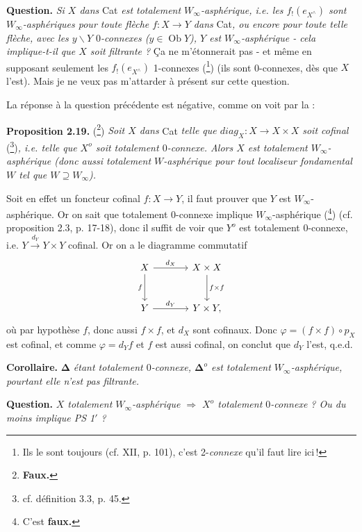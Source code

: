 \documentclass[11pt]{article}
\newcommand{\printedpage}[1]{\marginpar{\footnotesize p.~#1}}
\newcommand{\msp}[1]{\marginpar{\footnotesize [#1]}}
\newcommand{\Ob}{\operatorname{Ob}}
\begin{document}
\msp{page 36}
\noindent\textbf{Question.} \textit{Si $X$ dans} Cat \textit{est totalement $W_\infty$-asphérique, i.e. les $f_!(e_{X^\wedge})$ sont $W_\infty$-asphériques pour toute flèche $f : X \longrightarrow Y$ dans} Cat\textit{, ou encore pour toute telle flèche, avec les $y\backslash Y$ $0$-connexes ($y \in \Ob Y$), $Y$ est $W_\infty$-asphérique - cela implique-t-il que $X$ soit filtrante ?} Ça ne m'étonnerait pas - et même en supposant seulement les $f_!(e_{X^\wedge})$ 1-connexes (\footnote[42]{Ils le sont toujours (cf. XII, p. 101), c'est 2-\textit{connexe} qu'il faut lire ici\,!}) (ils sont 0-connexes, dès que $X$ l'est). Mais je ne veux pas m'attarder à présent sur cette question.

La réponse à la question précédente est négative, comme on voit par la :

\printedpage{22}

\noindent\textbf{Proposition 2.19.} (\footnote[43]{\textbf{Faux.}}) \textit{Soit $X$ dans} Cat \textit{telle que $\mathit{diag}_X : X \longrightarrow X \times X$ soit cofinal} (\footnote[44]{cf. définition 3.3, p. 45.})\textit{, i.e. telle que $X^o$ soit totalement $0$-connexe. Alors $X$ est totalement $W_\infty$-asphérique (donc aussi totalement $W$-asphérique pour tout localiseur fondamental $W$ tel que $W \supseteq W_\infty$).}

Soit en effet un foncteur cofinal $f : X \longrightarrow Y$, il faut prouver que $Y$ est $W_\infty$-asphérique. Or on sait que totalement 0-connexe implique $W_\infty$-asphérique (\footnote[45]{C'est \textbf{faux.}}) (cf. proposition 2.3, p. 17-18), donc il suffit de voir que $Y^o$ est totalement 0-connexe, i.e. $Y \xrightarrow{d_Y} Y \times Y$ cofinal. Or on a le diagramme commutatif
\[
\begin{tikzcd}[row sep=large, column sep=large]
X \arrow[r, "d_X"] \arrow[d, "f"'] & X \times X \arrow[d, "f \times f"] \\
Y \arrow[r, "d_Y"] & Y \times Y,
\end{tikzcd}
\]
où par hypothèse $f$, donc aussi $f \times f$, et $d_X$ sont cofinaux. Donc $\varphi = (f \times f) \circ p_X$ est cofinal, et comme $\varphi = d_Y f$ et $f$ est aussi cofinal, on conclut que $d_Y$ l'est, q.e.d.

\noindent\textbf{Corollaire.} $\mathbf{\Delta}$ \textit{étant totalement $0$-connexe, $\mathbf{\Delta}^o$ est totalement $W_\infty$-asphérique, pourtant elle n'est pas filtrante.}

\noindent\textbf{Question.} \textit{$X$ totalement $W_\infty$-asphérique $\Longrightarrow$ $X^o$ totalement $0$-connexe ? Ou du moins implique PS 1$'$ ?}
\end{document}
